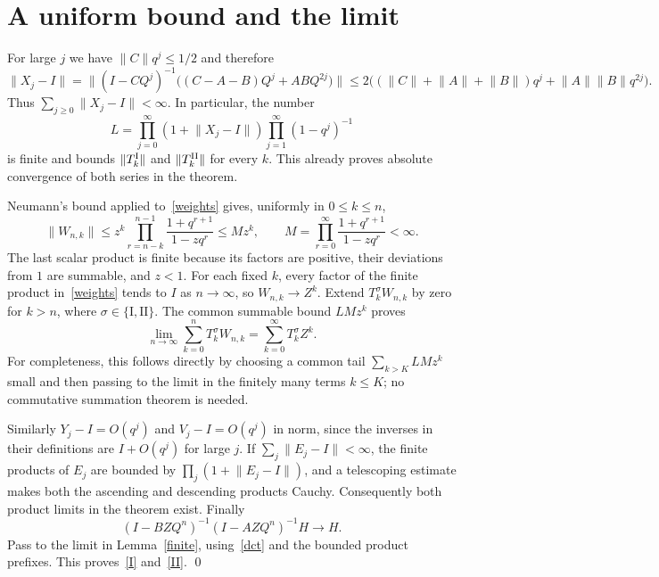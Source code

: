 \documentclass[11pt]{article}
\newcommand{\norm}[1]{\lVert#1\rVert}
\begin{document}
\section*{A uniform bound and the limit}
For large $j$ we have $\norm Cq^j\leq1/2$ and therefore
\[
 \norm{X_j-I}
 =\norm{(I-CQ^j)^{-1}\big((C-A-B)Q^j+ABQ^{2j}\big)}
 \leq2\big((\norm C+\norm A+\norm B)q^j
                      +\norm A\norm Bq^{2j}\big).
\]
Thus $\sum_{j\geq0}\norm{X_j-I}<\infty$. In particular, the number
\[
 L=\prod_{j=0}^{\infty}(1+\norm{X_j-I})
      \prod_{j=1}^{\infty}(1-q^j)^{-1}
\]
is finite and bounds $\norm{T_k^{\rm I}}$ and $\norm{T_k^{\rm II}}$
for every $k$. This already proves absolute convergence of both
series in the theorem.

Neumann's bound applied to~\eqref{weights} gives, uniformly in
$0\leq k\leq n$,
\begin{equation}\label{majorant}
 \norm{W_{n,k}}\leq z^k
 \prod_{r=n-k}^{n-1}\frac{1+q^{r+1}}{1-zq^r}
 \leq Mz^k,\qquad
 M=\prod_{r=0}^\infty\frac{1+q^{r+1}}{1-zq^r}<\infty.
\end{equation}
The last scalar product is finite because its factors are positive,
their deviations from $1$ are summable, and $z<1$.
For each fixed $k$, every factor of the finite product in~\eqref{weights}
tends to $I$ as $n\to\infty$, so $W_{n,k}\to Z^k$.
Extend $T_k^\sigma W_{n,k}$ by zero for $k>n$, where
$\sigma\in\{\mathrm I,\mathrm {II}\}$. The common summable bound
$LMz^k$ proves
\begin{equation}\label{dct}
 \lim_{n\to\infty}\sum_{k=0}^nT_k^\sigma W_{n,k}
       =\sum_{k=0}^\infty T_k^\sigma Z^k.
\end{equation}
For completeness, this follows directly by choosing a common tail
$\sum_{k>K}LMz^k$ small and then passing to the limit in the finitely
many terms $k\leq K$; no commutative summation theorem is needed.

Similarly $Y_j-I=O(q^j)$ and $V_j-I=O(q^j)$ in norm, since the
inverses in their definitions are $I+O(q^j)$ for large $j$.
If $\sum_j\norm{E_j-I}<\infty$, the finite products of $E_j$ are
bounded by $\prod_j(1+\norm{E_j-I})$, and a telescoping estimate
makes both the ascending and descending products Cauchy.
Consequently both product limits in the theorem exist.
Finally
\[
 (I-BZQ^n)^{-1}(I-AZQ^n)^{-1}H\longrightarrow H.
\]
Pass to the limit in Lemma~\ref{finite}, using~\eqref{dct} and the
bounded product prefixes. This proves~\eqref{I} and~\eqref{II}.
\qed
\end{document}
